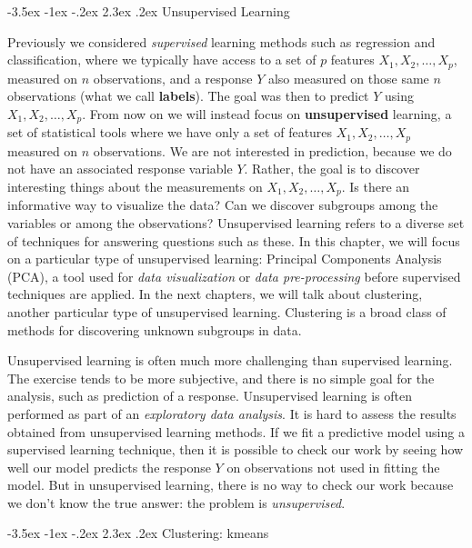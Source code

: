 \documentclass[]{book}
\makeatletter
\renewcommand\section{\@startsection {section}{1}{\z@}%
                                   {-3.5ex \@plus -1ex \@minus -.2ex}%
                                   {2.3ex \@plus.2ex}%
                                   {\normalfont\Large\bfseries\color{ForestGreen}}}
\theoremstyle{definition}
\theoremstyle{definition}
\theoremstyle{definition}
\theoremstyle{remark}
\makeatother
\begin{document}
\section{Unsupervised Learning}\label{unsupervised-learning-1}

Previously we considered \emph{supervised} learning methods such as
regression and classification, where we typically have access to a set
of \(p\) features \(X_1,X_2,\ldots,X_p\), measured on \(n\)
observations, and a response \(Y\) also measured on those same \(n\)
observations (what we call \textbf{labels}). The goal was then to
predict \(Y\) using \(X_1,X_2,\ldots,X_p\). From now on we will instead
focus on \textbf{unsupervised} learning, a set of statistical tools
where we have only a set of features \(X_1,X_2,\ldots,X_p\) measured on
\(n\) observations. We are not interested in prediction, because we do
not have an associated response variable \(Y\). Rather, the goal is to
discover interesting things about the measurements on
\(X_1,X_2,\ldots,X_p\). Is there an informative way to visualize the
data? Can we discover subgroups among the variables or among the
observations? Unsupervised learning refers to a diverse set of
techniques for answering questions such as these. In this chapter, we
will focus on a particular type of unsupervised learning: Principal
Components Analysis (PCA), a tool used for \emph{data visualization} or
\emph{data pre-processing} before supervised techniques are applied. In
the next chapters, we will talk about clustering, another particular
type of unsupervised learning. Clustering is a broad class of methods
for discovering unknown subgroups in data.

Unsupervised learning is often much more challenging than supervised
learning. The exercise tends to be more subjective, and there is no
simple goal for the analysis, such as prediction of a response.
Unsupervised learning is often performed as part of an \emph{exploratory
data analysis}. It is hard to assess the results obtained from
unsupervised learning methods. If we fit a predictive model using a
supervised learning technique, then it is possible to check our work by
seeing how well our model predicts the response \(Y\) on observations
not used in fitting the model. But in unsupervised learning, there is no
way to check our work because we don't know the true answer: the problem
is \emph{unsupervised}.

\section{Clustering: kmeans}\label{clustering-kmeans}
\end{document}
